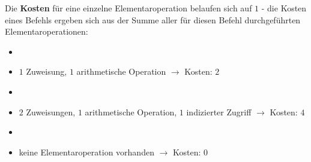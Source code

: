 \noindent
Die \textbf{Kosten} für eine einzelne Elementaroperation belaufen sich auf $1$ - die Kosten eines Befehls ergeben sich aus der Summe aller für diesen Befehl durchgeführten Elementaroperationen:


\begin{itemize}
    \item {}
    \item[] $1$ Zuweisung, $1$ arithmetische Operation $\rightarrow$ Kosten: $2$
    \item {}
    \item[] $2$ Zuweisungen, $1$ arithmetische Operation, $1$ indizierter Zugriff $\rightarrow$ Kosten: $4$
    \item {}
    \item[] keine Elementaroperation vorhanden $\rightarrow$ Kosten: $0$
\end{itemize}


